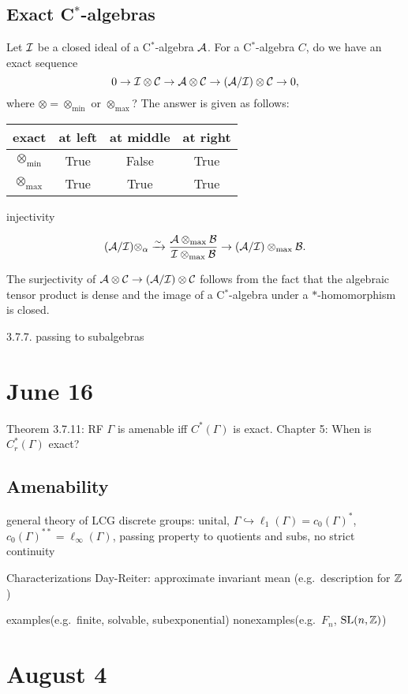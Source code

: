 \documentclass{../../small}
\begin{document}
\subsection{Exact C$^*$-algebras}


Let $\mathcal{I}$ be a closed ideal of a C$^*$-algebra $\mathcal{A}$.
For a C$^*$-algebra $C$, do we have an exact sequence
\[0\to\mathcal{I}\otimes\mathcal{C}\to\mathcal{A}\otimes\mathcal{C}\to(\mathcal{A}/\mathcal{I})\otimes\mathcal{C}\to0,\]
where $\otimes=\otimes_{\min}$ or $\otimes_{\max}$?
The answer is given as follows:
\begin{center}
\begin{tabular}{c|ccc}
exact&at left&at middle&at right\\\hline
$\otimes_{\min}$&True&False&True\\
$\otimes_{\max}$&True&True&True
\end{tabular}
\end{center}


injectivity

\[(\mathcal{A}/\mathcal{I})\otimes_\alpha\xrightarrow{\sim}\frac{\mathcal{A}\otimes_{\max}\mathcal{B}}{\mathcal{I}\otimes_{\max}\mathcal{B}}\to(\mathcal{A}/\mathcal{I})\otimes_{\max}\mathcal{B}.\]

The surjectivity of $\mathcal{A}\otimes\mathcal{C}\to(\mathcal{A}/\mathcal{I})\otimes\mathcal{C}$ follows from the fact that the algebraic tensor product is dense and the image of a C$^*$-algebra under a $*$-homomorphism is closed.



3.7.7. passing to subalgebras










\newpage
\section{June 16}

Theorem 3.7.11: RF $\Gamma$ is amenable iff $C^*(\Gamma)$ is exact.
Chapter 5: When is $C_r^*(\Gamma)$ exact?

\subsection{Amenability}

general theory of LCG
discrete groups: unital, $\Gamma\hookrightarrow\ell_1(\Gamma)=c_0(\Gamma)^*$, $c_0(\Gamma)^{**}=\ell_\infty(\Gamma)$, passing property to quotients and subs, no strict continuity

Characterizations
	Day-Reiter: approximate invariant mean (e.g.~description for $\mathbb{Z}$)

examples(e.g.~finite, solvable, subexponential)
nonexamples(e.g.~$F_n$, $\mathrm{SL}(n,\mathbb{Z})$)




\newpage
\section{August 4}
\end{document}
